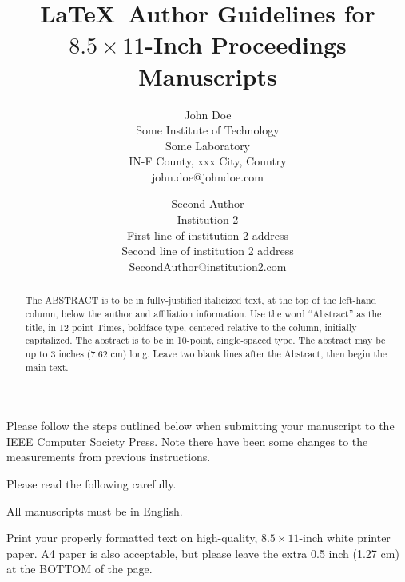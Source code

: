 \documentclass[times, 10pt,twocolumn]{article}
\begin{document}
	\title{\LaTeX\ Author Guidelines for {\boldmath $8.5 \times 11$-Inch} Proceedings Manuscripts}
	
	\author{John Doe\\
		Some Institute of Technology\\ Some Laboratory \\ IN-F 
		County, xxx City, Country\\ john.doe@johndoe.com\\
		\and
		Second Author\\
		Institution 2\\
		First line of institution 2 address\\ Second line of institution 2 address\\ 
		SecondAuthor@institution2.com\\
	}

	\maketitle
	\thispagestyle{empty}

	\begin{abstract}
	   The ABSTRACT is to be in fully-justified italicized text, at the top 
	   of the left-hand column, below the author and affiliation 
	   information. Use the word ``Abstract'' as the title, in 12-point 
	   Times, boldface type, centered relative to the column, initially 
	   capitalized. The abstract is to be in 10-point, single-spaced type. 
	   The abstract may be up to 3 inches (7.62 cm) long. Leave two blank 
	   lines after the Abstract, then begin the main text. 
	\end{abstract}


	Please follow the steps outlined below when submitting your 
	manuscript to the IEEE Computer Society Press. Note there have 
	been some changes to the measurements from previous instructions. 


	Please read the following carefully.


	All manuscripts must be in English.


	Print your properly formatted text on high-quality, $8.5 \times 11$-inch 
	white printer paper. A4 paper is also acceptable, but please leave the 
	extra 0.5 inch (1.27 cm) at the BOTTOM of the page.
\end{document}

